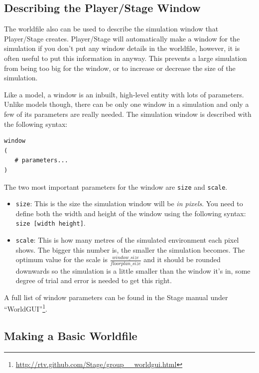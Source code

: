 \documentclass[a4paper]{report}
\newcommand{\plst}{Player/Stage\xspace}
\begin{document}
\subsection{Describing the \plst Window} \label{sec:BuildingAWorld:EmptyWorld:PLSTWindow}

The worldfile also can be used to describe the simulation window that \plst creates. \plst will automatically make a window for the simulation if you don't put any window details in the worldfile, however, it is often useful to put this information in anyway. This prevents a large simulation from being too big for the window, or to increase or decrease the size of the simulation.

Like a model, a window is an inbuilt, high-level entity with lots of parameters. Unlike models though, there can be only one window in a simulation and only a few of its parameters are really needed. The simulation window is described with the following syntax:
\begin{verbatim}
window
(
   # parameters...
)
\end{verbatim}

The two most important parameters for the window are \verb|size| and \verb|scale|.
\begin{itemize}
\item \verb|size|: This is the size the simulation window will be \emph{in pixels}. You need to define both the width and height of the window using the following syntax: \verb|size [width height]|. 
\item \verb|scale|: This is how many metres of the simulated environment each pixel shows. The bigger this number is, the smaller the simulation becomes. The optimum value for the scale is $\frac{window\_size}{floorplan\_size}$ and it should be rounded downwards so the simulation is a little smaller than the window it's in, some degree of trial and error is needed to get this right. 
\end{itemize}

A full list of window parameters can be found in the Stage manual under ``WorldGUI''\footnote{\url{http://rtv.github.com/Stage/group__worldgui.html}}.

\subsection{Making a Basic Worldfile}\label{sec:BuildingAWorld:EmptyWorld:BasicWorldfile}
\end{document}
